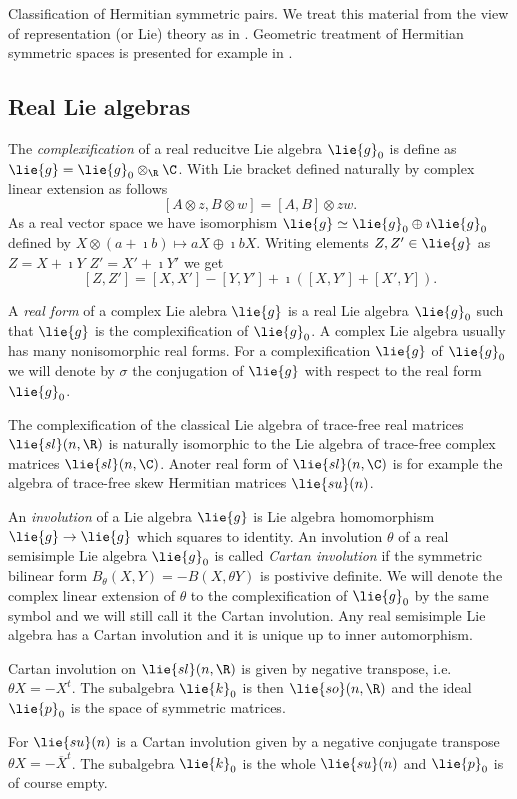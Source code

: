 Classification of Hermitian symmetric pairs. We treat this material from the view of representation (or Lie) theory as in \cite{knapp}. Geometric treatment of Hermitian symmetric spaces is presented for example in \cite{helgason}.

\subsection{Real Lie algebras}

The \emph{complexification} of a real reducitve Lie algebra $\lie{g}_0$ is define as $\lie{g} = \lie{g}_0\otimes_\R \C$. With Lie bracket defined naturally by complex linear extension as follows
\[
 [A\otimes z, B\otimes w] = [A,B]\otimes zw.
\]
As a real vector space we have isomorphism $\lie{g} \simeq \lie{g}_0 \oplus \imath \lie{g}_0$ defined by $X\otimes (a+\imath b) \mapsto aX \oplus \imath bX$. Writing elements $Z,Z'\in\lie{g}$ as $Z = X + \imath Y$ $Z'=X'+\imath Y'$ we get \[[Z,Z'] = [X,X'] - [Y,Y'] + \imath \left( [X,Y'] + [X',Y]\right).\]

A \emph{real form} of a complex Lie alebra $\lie{g}$ is a real Lie algebra $\lie{g}_0$ such that $\lie{g}$ is the complexification of $\lie{g}_0$. A complex Lie algebra usually has many nonisomorphic real forms. For a complexification $\lie{g}$ of $\lie{g}_0$ we will denote by $\sigma$ the conjugation of $\lie{g}$ with respect to the real form $\lie{g}_0$.

\begin{example}
 The complexification of the classical Lie algebra of trace-free real matrices $\lie{sl}(n,\R)$ is naturally isomorphic to the Lie algebra of trace-free complex matrices $\lie{sl}(n,\C)$. Anoter real form of $\lie{sl}(n,\C)$ is for example the algebra of trace-free skew Hermitian  matrices  $\lie{su}(n)$. %
\end{example}

An \emph{involution} of a Lie algebra $\lie{g}$ is Lie algebra homomorphism $\lie{g}\to\lie{g}$ which squares to identity. An involution $\theta$ of a real semisimple Lie algebra $\lie{g}_0$ is called \emph{Cartan involution} if the symmetric bilinear form $B_\theta(X,Y) = -B(X,\theta Y)$ is postivive definite. We will denote the complex linear extension of $\theta$ to the complexification of $\lie{g}_0$ by the same symbol and we will still call it the Cartan involution. Any real semisimple Lie algebra has a Cartan involution and it is unique up to inner automorphism.

\begin{example}
  Cartan involution on $\lie{sl}(n,\R)$ is given by negative transpose, i.e. $\theta X = - X^t$. The subalgebra $\lie{k}_0$ is then $\lie{so}(n,\R)$ and the ideal $\lie{p}_0$ is the space of symmetric matrices.

 For $\lie{su}(n)$ is a Cartan involution given by a negative conjugate transpose $\theta X = - \overline{X}^t$. The subalgebra $\lie{k}_0$ is the whole $\lie{su}(n)$ and $\lie{p}_0$ is of course empty.
\end{example}

